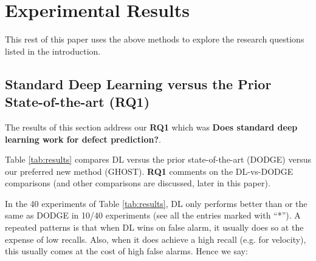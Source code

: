 \documentclass[10pt,compsoc,twocolumn]{IEEEtran}
\begin{document}





\section{Experimental Results}
\label{sec:results}

This rest of this paper uses the above methods to explore the research questions listed in
the introduction.

\subsection{Standard Deep Learning versus the Prior State-of-the-art ({\bf RQ1})}
\label{sec:rq1}



The results of this section address our {\bf RQ1} which was 
{\bf Does standard deep learning work for defect prediction?}.


Table \ref{tab:results} compares DL versus the prior state-of-the-art (DODGE) versus
our preferred new method (GHOST). {\bf RQ1} comments on the DL-vs-DODGE comparisons (and other comparisons are discussed, later in this paper).

 
In the 40 experiments of   Table \ref{tab:results}, DL only  performs  better than or the same as
DODGE in  10/40 experiments (see all the entries marked with ``*''). 
 A repeated patterns is that when DL wins on false alarm, it usually does so at the expense
 of low recalls.  Also,   when it does achieve a high recall (e.g. for velocity),
 this usually comes at the cost 
 of  high false alarms.
Hence we say:

\end{document}
